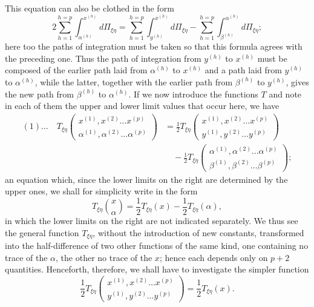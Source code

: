 \documentclass[10pt]{article}
\begin{document}
This equation can also be clothed in the form
\[
2\sum_{h=1}^{h=p}\int_{\alpha^{(h)}}^{x^{(h)}}d\Pi_{\xi\eta}
=\sum_{h=1}^{h=p}\int_{y^{(h)}}^{x^{(h)}}d\Pi_{\xi\eta}
-\sum_{h=1}^{h=p}\int_{\beta^{(h)}}^{\alpha^{(h)}}d\Pi_{\xi\eta};
\]
here too the paths of integration must be taken so that this formula agrees with the preceding one. Thus the path of integration from \(y^{(h)}\) to \(x^{(h)}\) must be composed of the earlier path laid from \(\alpha^{(h)}\) to \(x^{(h)}\) and a path laid from \(y^{(h)}\) to \(\alpha^{(h)}\), while the latter, together with the earlier path from \(\beta^{(h)}\) to \(y^{(h)}\), gives the new path from \(\beta^{(h)}\) to \(\alpha^{(h)}\). If we now introduce the functions \(T\) and note in each of them the upper and lower limit values that occur here, we have
\[
\begin{aligned}
(1)\ldots\quad
T_{\xi\eta}\begin{pmatrix}x^{(1)},x^{(2)}\ldots x^{(p)}\\ \alpha^{(1)},\alpha^{(2)}\ldots \alpha^{(p)}\end{pmatrix}
&=\frac12 T_{\xi\eta}\begin{pmatrix}x^{(1)},x^{(2)}\ldots x^{(p)}\\ y^{(1)},y^{(2)}\ldots y^{(p)}\end{pmatrix}\\
&\quad-\frac12 T_{\xi\eta}\begin{pmatrix}\alpha^{(1)},\alpha^{(2)}\ldots\alpha^{(p)}\\ \beta^{(1)},\beta^{(2)}\ldots\beta^{(p)}\end{pmatrix};
\end{aligned}
\]
an equation which, since the lower limits on the right are determined by the upper ones, we shall for simplicity write in the form
\[
T_{\xi\eta}\binom{x}{\alpha}=\frac12T_{\xi\eta}(x)-\frac12T_{\xi\eta}(\alpha),
\]
in which the lower limits on the right are not indicated separately. We thus see the general function \(T_{\xi\eta}\), without the introduction of new constants, transformed into the half-difference of two other functions of the same kind, one containing no trace of the \(\alpha\), the other no trace of the \(x\); hence each depends only on \(p+2\) quantities. Henceforth, therefore, we shall have to investigate the simpler function
\[
\frac12T_{\xi\eta}\begin{pmatrix}x^{(1)},x^{(2)}\ldots x^{(p)}\\ y^{(1)},y^{(2)}\ldots y^{(p)}\end{pmatrix}=\frac12T_{\xi\eta}(x).
\]
\end{document}
